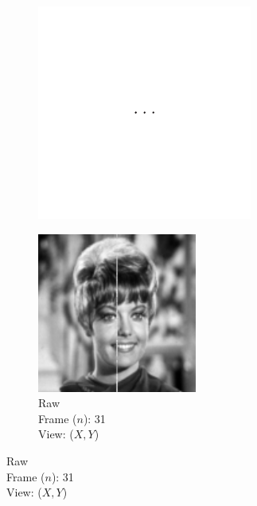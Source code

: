 \documentclass{osa-article}
\begin{document}
\begin{figure}
\begin{subfigure}[t]{0.2\linewidth}
  \end{subfigure}\hfill
  \begin{subfigure}[t]{0.2\linewidth}
    \centering
    \includegraphics[width=\linewidth]{./figures/results/3D_python/no_drift_zelda/dots/zx}%
  \end{subfigure}
  \begin{subfigure}[t]{0.2\linewidth}
    \centering
    \includegraphics[width=\linewidth]{./figures/results/3D_python/no_drift_zelda/31/xy}\caption{Raw\\Frame (\(n\)): 31\\View: (\(X,Y\))}

\end{subfigure}
\end{figure}
\end{document}
